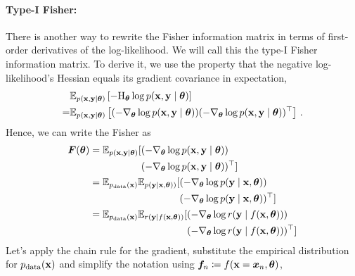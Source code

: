 \paragraph{Type-I Fisher:} There is another way to rewrite the Fisher information matrix in terms of first-order derivatives of the log-likelihood.
We will call this the type-I Fisher information matrix.
To derive it, we use the property that the negative log-likelihood's Hessian equals its gradient covariance in expectation,
\begin{align*}
    & \mathbb{E}_{p({\mathbf{x}}, {\mathbf{y}} \mid {\bm{\theta}})}
  \left[
    -\mathrm{H}_{{\bm{\theta}}} \log p({\mathbf{x}}, {\mathbf{y}} \mid {\bm{\theta}})
    \right]
  \\
  = & \mathbb{E}_{p({\mathbf{x}}, {\mathbf{y}} \mid {\bm{\theta}})}
  \left[
    (-\nabla_{{\bm{\theta}}} \log p({\mathbf{x}}, {\mathbf{y}} \mid {\bm{\theta}}))
    (-\nabla_{{\bm{\theta}}} \log p({\mathbf{x}}, {\mathbf{y}}\mid  {\bm{\theta}}))^{\top}
    \right]\,.
\end{align*}
Hence, we can write the Fisher as
\begin{align*}
  {\bm{F}}({\bm{\theta}}) & = \mathbb{E}_{p({\mathbf{x}}, {\mathbf{y}} \mid {\bm{\theta}})} [
    \begin{aligned}[t]
       & (-\nabla_{{\bm{\theta}}} \log p({\mathbf{x}}, {\mathbf{y}} \mid {\bm{\theta}}))        \\
       & (-\nabla_{{\bm{\theta}}} \log p({\mathbf{x}}, {\mathbf{y}} \mid {\bm{\theta}}))^{\top}]
    \end{aligned}
  \\
               & = \mathbb{E}_{p_{\text{data}}({\mathbf{x}})}\mathbb{E}_{p({\mathbf{y}} \mid {\mathbf{x}}, {\bm{\theta}}))} [
    \begin{aligned}[t]
       & (-\nabla_{{\bm{\theta}}} \log p({\mathbf{y}} \mid {\mathbf{x}}, {\bm{\theta}}))        \\
       & (-\nabla_{{\bm{\theta}}} \log p({\mathbf{y}} \mid {\mathbf{x}}, {\bm{\theta}}))^{\top}]
    \end{aligned}
  \\
               & = \mathbb{E}_{p_{\text{data}}({\mathbf{x}})}\mathbb{E}_{r({\mathbf{y}} \mid f({\mathbf{x}}, {\bm{\theta}}))} [
    \begin{aligned}[t]
       & (-\nabla_{{\bm{\theta}}} \log r({\mathbf{y}} \mid f({\mathbf{x}}, {\bm{\theta}})))        \\
       & (-\nabla_{{\bm{\theta}}} \log r({\mathbf{y}} \mid f({\mathbf{x}}, {\bm{\theta}})))^{\top}]
    \end{aligned}
\end{align*}
Let's apply the chain rule for the gradient, substitute the empirical distribution for $p_{\text{data}}({\mathbf{x}})$ and simplify the notation using ${\bm{f}}_n \coloneqq f({\mathbf{x}} = {\bm{x}}_n, {\bm{\theta}})$,
